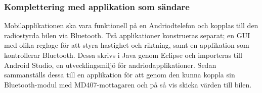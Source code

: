 \documentclass[a4paper]{article}
\begin{document}







\subsubsection{Komplettering med applikation som sändare}
\vspace{5mm} \noindent
Mobilapplikationen ska vara funktionell på en Andriodtelefon och kopplas till den radiostyrda bilen via Bluetooth. Två applikationer konstrueras separat; en GUI med olika reglage för att styra hastighet och riktning, samt en applikation som kontrollerar Bluetooth. Dessa skrivs i Java genom Eclipse och importeras till Android Studio, en utvecklingsmiljö för andriodapplikationer. Sedan sammanställs dessa till en applikation för att genom den kunna koppla sin Bluetooth-modul med MD407-mottagaren och på så vis skicka värden till bilen.
\end{document}
